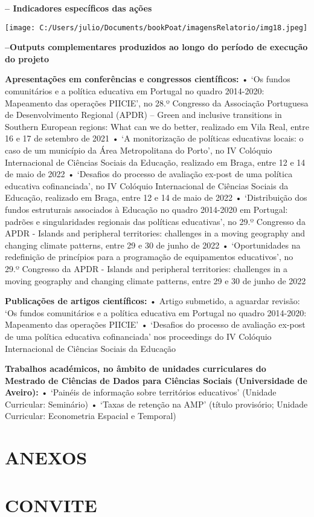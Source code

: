 \documentclass[
]{book}
\begin{document}
\textbf{\textbar\textbar\textbar{} -- Indicadores específicos das ações}

\texttt{[image: C:/Users/julio/Documents/bookPoat/imagensRelatorio/img18.jpeg]}

\textbf{\textbar\textbar\textbar\textbar{} --Outputs complementares produzidos ao longo do período de execução do projeto}

\textbf{Apresentações em conferências e congressos científicos:}
• `Os fundos comunitários e a política educativa em Portugal no quadro 2014-2020: Mapeamento das operações PIICIE', no 28.º Congresso da Associação Portuguesa de Desenvolvimento Regional (APDR) -- Green and inclusive transitions in Southern European regions: What can we do better, realizado em Vila Real, entre 16 e 17 de setembro de 2021
• `A monitorização de políticas educativas locais: o caso de um município da Área Metropolitana do Porto', no IV Colóquio Internacional de Ciências Sociais da Educação, realizado em Braga, entre 12 e 14 de maio de 2022
• `Desafios do processo de avaliação ex-post de uma política educativa cofinanciada', no IV Colóquio Internacional de Ciências Sociais da Educação, realizado em Braga, entre 12 e 14 de maio de 2022
• `Distribuição dos fundos estruturais associados à Educação no quadro 2014-2020 em Portugal: padrões e singularidades regionais das políticas educativas', no 29.º Congresso da APDR - Islands and peripheral territories: challenges in a moving geography and changing climate patterns, entre 29 e 30 de junho de 2022
• `Oportunidades na redefinição de princípios para a programação de equipamentos educativos', no 29.º Congresso da APDR - Islands and peripheral territories: challenges in a moving geography and changing climate patterns, entre 29 e 30 de junho de 2022

\textbf{Publicações de artigos científicos:}
• Artigo submetido, a aguardar revisão: `Os fundos comunitários e a política educativa em Portugal no quadro 2014-2020: Mapeamento das operações PIICIE'
• `Desafios do processo de avaliação ex-post de uma política educativa cofinanciada' nos proceedings do IV Colóquio Internacional de Ciências Sociais da Educação

\textbf{Trabalhos académicos, no âmbito de unidades curriculares do Mestrado de Ciências de Dados para Ciências Sociais (Universidade de Aveiro):}
• `Painéis de informação sobre territórios educativos' (Unidade Curricular: Seminário)
• `Taxas de retenção na AMP' (título provisório; Unidade Curricular: Econometria Espacial e Temporal)

\hypertarget{anexos}{%
\chapter*{\texorpdfstring{\textbf{ANEXOS}}{ANEXOS}}\label{anexos}}

\hypertarget{convite}{%
\chapter*{\texorpdfstring{\textbf{CONVITE}}{CONVITE}}\label{convite}}

  
\end{document}
